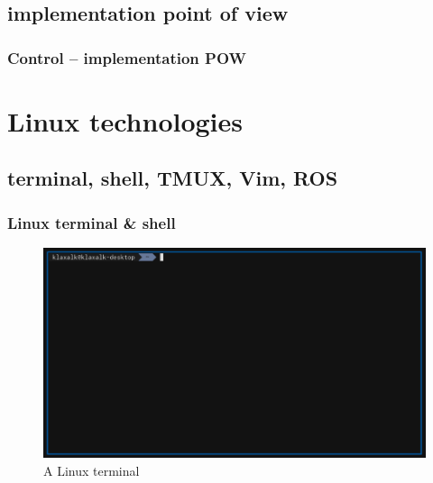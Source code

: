 \documentclass{beamer}
\begin{document}
\subsection{implementation point of view}

\begin{frame}
  \frametitle{Control -- implementation POW}

\end{frame}


\section{Linux technologies}
\subsection{terminal, shell, TMUX, Vim, ROS}

\begin{frame}
  \frametitle{Linux terminal \& shell}

  \begin{figure}
    \caption{A Linux terminal}
    \includegraphics[width=1.0\textwidth]{./fig/terminal.png}
  \end{figure}

\end{frame}
\end{document}
